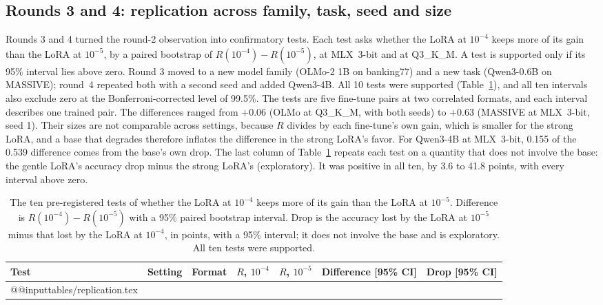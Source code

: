 \documentclass[10pt]{article}
\makeatletter
\newcommand*{\tablerows}[1]{\csname @@input\endcsname #1 }
\makeatother
\begin{document}
\subsection{Rounds 3 and 4: replication across family, task, seed and size}
\label{sec:replication}

Rounds 3 and 4 turned the round-2 observation into confirmatory tests. Each test asks whether the LoRA at $10^{-4}$ keeps more of its gain than the LoRA at $10^{-5}$, by a paired bootstrap of $R(10^{-4}) - R(10^{-5})$, at MLX~3-bit and at Q3\_K\_M. A test is supported only if its 95\% interval lies above zero. Round 3 moved to a new model family (OLMo-2 1B on banking77) and a new task (Qwen3-0.6B on MASSIVE); round~4 repeated both with a second seed and added Qwen3-4B. All 10 tests were supported (Table~\ref{tab:replication}), and all ten intervals also exclude zero at the Bonferroni-corrected level of 99.5\%. The tests are five fine-tune pairs at two correlated formats, and each interval describes one trained pair. The differences ranged from $+0.06$ (OLMo at Q3\_K\_M, with both seeds) to $+0.63$ (MASSIVE at MLX~3-bit, seed 1). Their sizes are not comparable across settings, because $R$ divides by each fine-tune's own gain, which is smaller for the strong LoRA, and a base that degrades therefore inflates the difference in the strong LoRA's favor. For Qwen3-4B at MLX~3-bit, 0.155 of the 0.539 difference comes from the base's own drop. The last column of Table~\ref{tab:replication} repeats each test on a quantity that does not involve the base: the gentle LoRA's accuracy drop minus the strong LoRA's (exploratory). It was positive in all ten, by 3.6 to 41.8 points, with every interval above zero.

\begin{table}[htbp]
\centering\footnotesize
\caption{The ten pre-registered tests of whether the LoRA at $10^{-4}$ keeps more of its gain than the LoRA at $10^{-5}$. Difference is $R(10^{-4}) - R(10^{-5})$ with a 95\% paired bootstrap interval. Drop is the accuracy lost by the LoRA at $10^{-5}$ minus that lost by the LoRA at $10^{-4}$, in points, with a 95\% interval; it does not involve the base and is exploratory. All ten tests were supported.}
\label{tab:replication}
\setlength{\tabcolsep}{4pt}
\begin{tabular}{llcrrll}
\toprule
Test & Setting & Format & $R$, $10^{-4}$ & $R$, $10^{-5}$ & Difference [95\% CI] & Drop [95\% CI] \\
\midrule
\tablerows{tables/replication.tex}
\bottomrule
\end{tabular}
\end{table}
\end{document}
